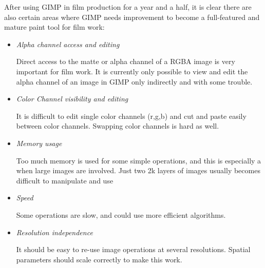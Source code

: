 After using GIMP in film production for a year and a half, it is clear there
are also certain areas where GIMP needs improvement to become a full-featured
and mature paint tool for film work:
\begin{itemize}

\item {\em Alpha channel access and editing}

Direct access to the matte or alpha channel of a RGBA image is very important
for film work. It is currently only possible to view and edit the alpha channel
of an image in GIMP only indirectly and with some trouble.  

\item {\em Color Channel visibility and editing}

It is difficult to edit single color channels (r,g,b) and cut and paste easily
between color channels. Swapping color channels is hard as well.

\item {\em Memory usage}

Too much memory is used for some simple operations, and this is especially 
a when large images are involved. Just two 2k layers of images usually becomes
difficult to manipulate and use

\item {\em Speed}

Some operations are slow, and could use more efficient algorithms.

\item {\em Resolution independence} 

It should be easy to re-use image operations at several resolutions. Spatial
parameters should scale correctly to make this work.
\end{itemize}

